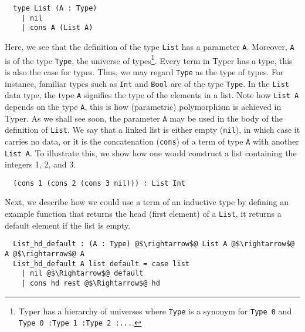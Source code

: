 \documentclass[12pt,twoside,maitrise]{dms}
\theoremstyle{definition}
\numberwithin{equation}{section}
\numberwithin{table}{chapter}
\numberwithin{figure}{chapter}
\newcommand\id[1] {\texttt{#1}}
\newcommand\fn[1] {\texttt{#1}}
\begin{document}
\begin{verbatim}
  type List (A : Type)
    | nil
    | cons A (List A)
\end{verbatim}

Here, we see that the definition of the type \id{List} has a parameter \id{A}.
Moreover, \id{A} is of the type \id{Type}, the universe of types\footnote{Typer
has a hierarchy of universes where \id{Type} is a synonym for \id{Type 0} and
\fn{Type 0 :\@ Type 1 :\@ Type 2 :\@ ...}.}. Every term in Typer has a type,
this is also the case for types. Thus, we may regard \id{Type} as the type of
types. For instance, familiar types such as \id{Int} and \id{Bool} are of the
type \id{Type}. In the \id{List} data type, the type \id{A} signifies the type
of the elements in a list.  Note how \id{List A} depends on the type \id{A},
this is how (parametric) polymorphism is achieved in Typer. As we shall see
soon, the parameter \id{A} may be used in the body of the definition of
\id{List}. We say that a linked list is either empty (\id{nil}), in which case
it carries no data, or it is the concatenation (\id{cons}) of a term of type
\id{A} with another \fn{List A}. To illustrate this, we show how one would
construct a list containing the integers 1, 2, and 3.

\begin{verbatim}
  (cons 1 (cons 2 (cons 3 nil))) : List Int
\end{verbatim}

Next, we describe how we could use a term of an inductive type by defining an
example function that returns the head (first element) of a \id{List}, it
returns a default element if the list is empty.

\begin{verbatim}
  List_hd_default : (A : Type) @$\rightarrow$@ List A @$\rightarrow$@ A @$\rightarrow$@ A
  List_hd_default A list default = case list
    | nil @$\Rightarrow$@ default
    | cons hd rest @$\Rightarrow$@ hd
\end{verbatim}
\end{document}
